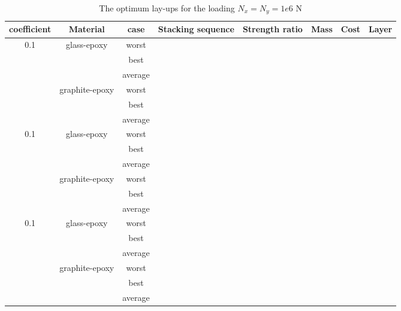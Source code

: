 \begin{table*}[!htb]
\caption{The optimum lay-ups for the loading $N_x=N_y=1e6$ N}
\centering
\begin{adjustbox}{width=1\textwidth}
	\begin{tabular}{cccccccc}
	\toprule
	coefficient		     &	 Material		               	 & case     & Stacking sequence   & Strength ratio  & Mass  &  Cost   & Layer    \\ 
	\midrule																															  
	\multirow{6}{*}{0.1} &	\multirow{3}{*}{glass-epoxy}   	 & worst     &                    &                 &        &         &       \\
						 &								     & best      &                    &                 &        &         &       \\
					     &									 & average   &                    &                 &        &         &    \\
						 &	\multirow{3}{*}{graphite-epoxy}	 & worst     &                    &                 &        &         &    \\
					     &								     & best      &               &                 &        &         &   \\
					     &								     & average   &               &                 &        &         &   \\
	\multirow{6}{*}{0.1} &	\multirow{3}{*}{glass-epoxy}   	 & worst     &                    &                 &        &         &       \\
						 &								     & best      &                    &                 &        &         &       \\
					     &									 & average   &                    &                 &        &         &    \\
						 &	\multirow{3}{*}{graphite-epoxy}	 & worst     &                    &                 &        &         &    \\
					     &								     & best      &               &                 &        &         &   \\
					     &								     & average   &               &                 &        &         &   \\
	\multirow{6}{*}{0.1} &	\multirow{3}{*}{glass-epoxy}   	 & worst     &                    &                 &        &         &       \\
						 &								     & best      &                    &                 &        &         &       \\
					     &									 & average   &                    &                 &        &         &    \\
						 &	\multirow{3}{*}{graphite-epoxy}	 & worst     &                    &                 &        &         &    \\
					     &								     & best      &               &                 &        &         &   \\
					     &								     & average   &               &                 &        &         &   \\
\end{tabular}
\end{adjustbox}
\label{tab:NxNy}
\end{table*}
